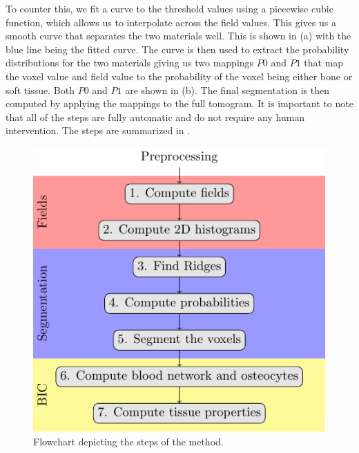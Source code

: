 To counter this, we fit a curve to the threshold values using a piecewise cubic
function, which allows us to interpolate across the field values. This gives us
a smooth curve that separates the two materials well. This is shown in
(a) with the blue line being the fitted curve. The curve is then
used to extract the probability distributions for the two materials giving us
two mappings $P0$ and $P1$ that map the voxel value and field value to the
probability of the voxel being either bone or soft tissue. Both $P0$ and $P1$
are shown in (b). The final segmentation is then computed by
applying the mappings to the full tomogram. It is important to note that all of
the steps are fully automatic and do not require any human intervention. The
steps are summarized in .

\begin{figure}
    \centering
    \includegraphics{steps}
    \caption{Flowchart depicting the steps of the method.}
    \label{fig:flowchart}
\end{figure}

